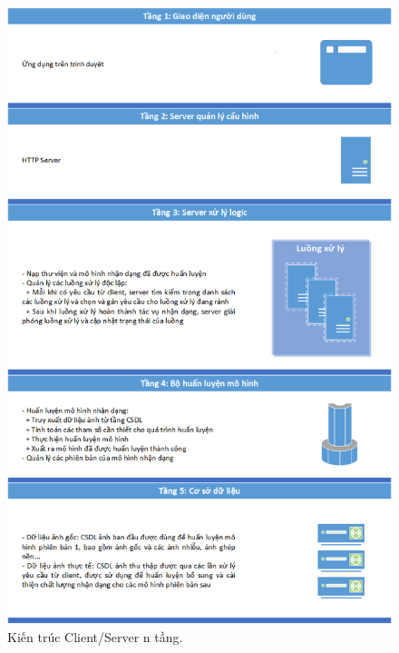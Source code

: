 \begin{figure}[H]
	\centering
	\includegraphics[width=0.8\linewidth]{images/client_server_ntang}
	\caption{Kiến trúc Client/Server n tầng.}
	\label{fig:client_server_ntang}
\end{figure}

